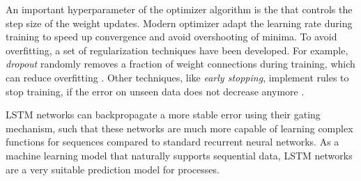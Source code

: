 An important hyperparameter of the optimizer algorithm is the  that controls the step size of the weight updates.
Modern optimizer adapt the learning rate during training to speed up convergence and avoid overshooting of minima.
To avoid overfitting, a set of regularization techniques have been developed.
For example, \textit{dropout} randomly removes a fraction of weight connections during training, which can reduce overfitting \cite{DBLP:journals/corr/abs-1207-0580}.
Other techniques, like \textit{early stopping}, implement rules to stop training, if the error on unseen data does not decrease anymore \cite{DBLP:series/lncs/Prechelt12}.

LSTM networks can backpropagate a more stable error using their gating mechanism, such that these networks are much more capable of learning complex functions for sequences compared to standard recurrent neural networks.
As a machine learning model that naturally supports sequential data, LSTM networks are a very suitable prediction model for processes.


